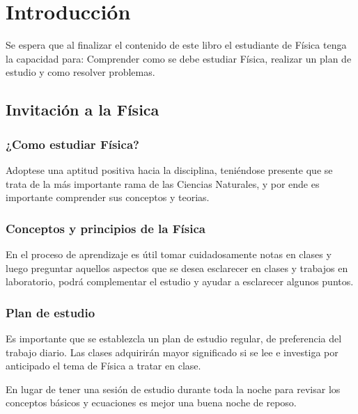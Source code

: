 \chapter*{Introducción}

Se espera que al finalizar el contenido de este libro el estudiante de Física tenga la capacidad para: Comprender como se debe 
estudiar Física, realizar un plan de estudio y como resolver problemas.

\section*{Invitación a la Física}

\vspace{1.0cm}

\subsection*{¿Como estudiar Física?} 

Adoptese una aptitud positiva hacia la disciplina, teniéndose presente que se trata de la más importante rama de las Ciencias 
Naturales, y por ende es importante comprender sus conceptos y teorias.

\subsection*{Conceptos y principios de la Física}

En el proceso de aprendizaje es útil tomar cuidadosamente notas en clases y luego preguntar aquellos aspectos que se desea 
esclarecer en clases y trabajos en laboratorio, podrá complementar el estudio y ayudar a esclarecer algunos puntos.

\subsection*{Plan de estudio}

Es importante que se establezcla un plan de estudio regular, de preferencia del trabajo diario. Las clases adquirirán mayor 
significado si se lee e investiga por anticipado el tema de Física a tratar en clase.\\

\begin{tcolorbox}
En lugar de tener una sesión de estudio durante toda la noche para revisar los conceptos básicos y ecuaciones es mejor una buena 
noche de reposo.
\end{tcolorbox}

